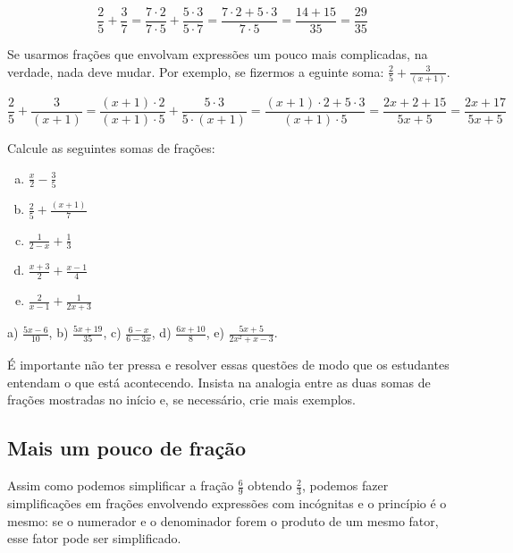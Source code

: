 \documentclass[main.tex]{subfiles}
\begin{document}
$$
\frac{2}{5} + \frac{3}{7} = \frac{7 \cdot 2}{7 \cdot 5} + \frac{5 \cdot 3}{5 \cdot 7} = \frac{7 \cdot 2 + 5 \cdot 3}{7 \cdot 5} = \frac{14 + 15}{35} = \frac{29}{35}
$$

Se usarmos frações que envolvam expressões um pouco mais complicadas, na verdade, nada deve mudar. Por exemplo, se fizermos a eguinte soma: $\frac{2}{5}+\frac{3}{(x+1)}$.

$$
\frac{2}{5} + \frac{3}{(x+1)} = \frac{(x+1) \cdot 2}{(x+1) \cdot 5} + \frac{5 \cdot 3}{5 \cdot (x+1)} = \frac{(x+1) \cdot 2 + 5 \cdot 3}{(x+1) \cdot 5} = \frac{2x+2+15}{5x+5} = \frac{2x+17}{5x+5}
$$

\begin{questao}
Calcule as seguintes somas de frações:
\begin{enumerate}[a)]
\item $\frac{x}{2}-\frac{3}{5}$
\item $\frac{2}{5}+\frac{(x+1)}{7}$
\item $\frac{1}{2-x}+\frac{1}{3}$
\item $\frac{x+3}{2}+\frac{x-1}{4}$
\item $\frac{2}{x-1}+\frac{1}{2x+3}$
\end{enumerate}
\end{questao}

\begin{gabarito}
	\begin{gabaritoQuestao}
		a) $\frac{5x-6}{10}$, b) $\frac{5x+19}{35}$, c) $\frac{6-x}{6-3x}$, d) $\frac{6x+10}{8}$, e) $\frac{5x+5}{2x^2+x-3}$.
	\end{gabaritoQuestao}
\end{gabarito}

\paraTutores

É importante não ter pressa e resolver essas questões de modo que os estudantes entendam o que está acontecendo. Insista na analogia entre as duas somas de frações mostradas no início e, se necessário, crie mais exemplos.

\paraAmbos

\subsection*{Mais um pouco de fração}

Assim como podemos simplificar a fração $\frac{6}{9}$ obtendo $\frac{2}{3}$, podemos fazer simplificações em frações envolvendo expressões com incógnitas e o princípio é o mesmo: se o numerador e o denominador forem o produto de um mesmo fator, esse fator pode ser simplificado.
\end{document}
